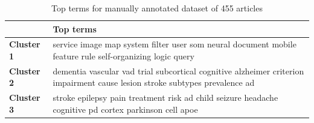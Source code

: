 \begin{table}
\begin{tabular}{|p{2cm}|p{10.5cm}|} 
\hline %
\textbf{ } & \textbf{Top terms} \\ 
\hline 
\textbf{Cluster 1} & service image map system filter user som neural document mobile feature rule self-organizing logic query  \\ 
\hline
\hline 
\textbf{Cluster 2} & dementia vascular vad trial subcortical cognitive alzheimer criterion impairment cause lesion stroke subtypes prevalence ad  \\ 
\hline
\hline 
\textbf{Cluster 3} & stroke epilepsy pain treatment risk ad child seizure headache cognitive pd cortex parkinson cell apoe \\ 
\hline
\hline 
\end{tabular} %
\caption{Top terms for manually annotated dataset of 455 articles}
\label{table:topterms_455_hier}
\end{table} %

